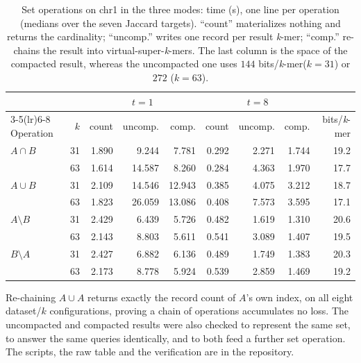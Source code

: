 \documentclass[runningheads,a4paper]{llncs}
\newcommand{\kmer}{\emph{k}-mer\xspace}
\newcommand{\vskmers}{virtual-super-\emph{k}-mers\xspace}
\newif\ifrevmarkup\revmarkupfalse
\newcommand{\rev}[1]{\ifrevmarkup\textcolor{blue}{#1}\else#1\fi}
\newenvironment{revblock}{\ifrevmarkup\color{blue}\fi}{}
\begin{document}
\begin{revblock}
\begin{table}[h]
\centering
\caption{\rev{Set operations on chr1 in the three modes: time (s), one line per operation (medians over the seven Jaccard targets). ``count'' materializes nothing and returns the cardinality; ``uncomp.'' writes one record per result \kmer; ``comp.'' re-chains the result into \vskmers. The last column is the space of the compacted result, whereas the uncompacted one uses $144$ bits/\kmer ($k=31$) or $272$ ($k=63$).}}
\label{tab:rechain-e2e}
\small
\setlength{\tabcolsep}{5pt}
\begin{revblock}
\begin{tabular}{lrrrrrrrr}
\toprule
 & & \multicolumn{3}{c}{$t=1$} & \multicolumn{3}{c}{$t=8$} & \\
\cmidrule(lr){3-5}\cmidrule(lr){6-8}
Operation & $k$ & count & uncomp. & comp. & count & uncomp. & comp. & bits/\kmer \\
\midrule
$A\cap B$      & 31 & 1.890 &  9.244 &  7.781 & 0.292 & 2.271 & 1.744 & 19.2 \\
               & 63 & 1.614 & 14.587 &  8.260 & 0.284 & 4.363 & 1.970 & 17.7 \\
$A\cup B$      & 31 & 2.109 & 14.546 & 12.943 & 0.385 & 4.075 & 3.212 & 18.7 \\
               & 63 & 1.823 & 26.059 & 13.086 & 0.408 & 7.573 & 3.595 & 17.1 \\
$A\setminus B$ & 31 & 2.429 &  6.439 &  5.726 & 0.482 & 1.619 & 1.310 & 20.6 \\
               & 63 & 2.143 &  8.803 &  5.611 & 0.541 & 3.089 & 1.407 & 19.5 \\
$B\setminus A$ & 31 & 2.427 &  6.882 &  6.136 & 0.489 & 1.749 & 1.383 & 20.3 \\
               & 63 & 2.173 &  8.778 &  5.924 & 0.539 & 2.859 & 1.469 & 19.2 \\
\bottomrule
\end{tabular}
\end{revblock}
\end{table}

Re-chaining $A\cup A$ returns exactly the record count of $A$'s own index, on all eight dataset/$k$ configurations, proving a chain of operations accumulates no loss. The uncompacted and compacted results were also checked to represent the same set, to answer the same queries identically, and to both feed a further set operation. The scripts, the raw table and the verification are in the repository.
\end{revblock}
\end{document}
